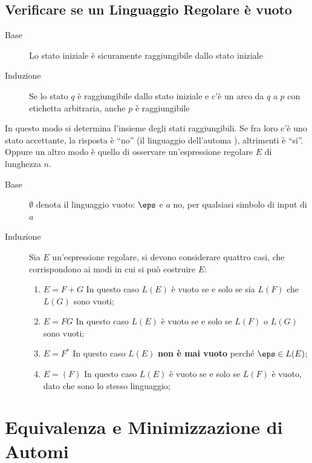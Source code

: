\subsection{Verificare se un Linguaggio Regolare è vuoto}\label{sub:lr_verificare_se_un_linguaggio_regolare_vuoto} %
\begin{remark}{}{}
    \begin{description}
        \item[Base] Lo stato iniziale è sicuramente raggiungibile dallo stato iniziale
        \item[Induzione] Se lo stato $q$ è raggiungibile dallo stato iniziale e c'è un arco da $q$ a $p$ con etichetta arbitraria, anche $p$ è raggiungibile
    \end{description}
\end{remark}
In questo modo si determina l'insieme degli stati raggiungibili.
Se fra loro c'è uno stato accettante, la risposta è ``no'' (il linguaggio dell'automa ), altrimenti è ``si''.
\emptyln{}
Oppure un altro modo è quello di osservare un'espressione regolare $E$ di lunghezza $n$.
\begin{remark}{}{}
    \begin{description}
        \item[Base] $\emptyset$ denota il linguaggio vuoto: $\eps$ e $a$ no, per qualsiasi simbolo di input di $a$
        \item[Induzione] Sia $E$ un'espressione regolare, si devono considerare quattro casi, che corrispondono ai modi in cui si può costruire $E$:
            \begin{enumerate}
                \item $E = F + G$ In questo caso $L(E)$ è vuoto se e solo se sia $L(F)$ che $L(G)$ sono vuoti;
                \item $E = FG$ In questo caso $L(E)$ è vuoto se e solo se $L(F)$ o $L(G)$ sono vuoti;
                \item $E = F^*$ In questo caso $L(E)$ \textbf{non è mai vuoto} perché $\eps \in L(E)$;
                \item $E = (F)$ In questo caso $L(E)$ è vuoto se e solo se $L(F)$ è vuoto, dato che sono lo stesso linguaggio;
            \end{enumerate}
    \end{description}
\end{remark}
%
\section{Equivalenza e Minimizzazione di Automi}\label{sec:lr_equivalenza_e_minimizzazione_di_automi} %
